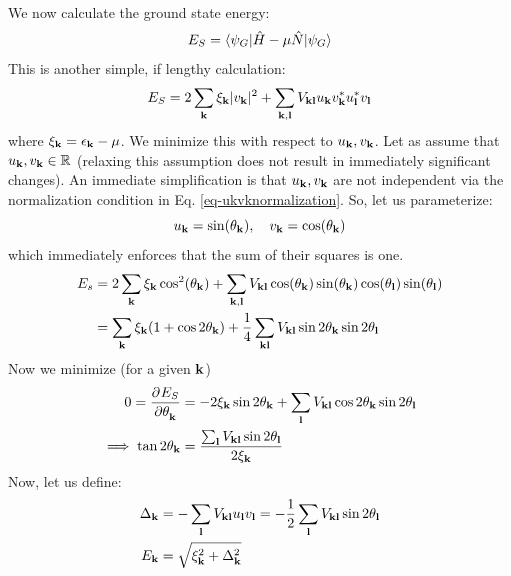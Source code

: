 We now calculate the ground state energy:
\begin{equation}
    E_S = \langle \psi_G \rvert\hat{H}- \mu\hat{N}\lvert \psi_G \rangle
\end{equation}
This is another simple, if lengthy calculation:
\begin{equation}
      E_S = 2\sum_{\mathbf{k}}\xi_{\mathbf{k}}\lvert v_{\mathbf{k}} \rvert^2 + \sum_{\mathbf{k}, \mathbf{l}}V_{\mathbf{k}\mathbf{l}}u_{\mathbf{k}}v_{\mathbf{k}}^* u_{\mathbf{l}}^* v_{\mathbf{l}}
\end{equation}
where $\xi_{\mathbf{k}} = \epsilon_{\mathbf{k}} - \mu$. We minimize this with respect to $u_{\mathbf{k}}, v_{\mathbf{k}}$. Let as assume that $u_{\mathbf{k}}, v_{\mathbf{k}} \in \mathbb{R}$ (relaxing this assumption does not result in immediately significant changes). An immediate simplification is that $u_{\mathbf{k}}, v_{\mathbf{k}}$ are not independent via the normalization condition in Eq. \eqref{eq-ukvknormalization}. So, let us parameterize:
\begin{equation}
    u_{\mathbf{k}} = \sin(\theta_{\mathbf{k}}), \quad v_{\mathbf{k}} = \cos(\theta_{\mathbf{k}})
\end{equation}
which immediately enforces that the sum of their squares is one.
\begin{equation}
    \begin{split}
        E_s &= 2\sum_{\mathbf{k}}\xi_{\mathbf{k}}\cos^2(\theta_{\mathbf{k}}) + \sum_{\mathbf{k}, \mathbf{l}}V_{\mathbf{k}\mathbf{l}} \cos(\theta_{\mathbf{k}})\sin(\theta_{\mathbf{k}})\cos(\theta_{\mathbf{l}})\sin(\theta_{\mathbf{l}}) \\ &= \sum_{\mathbf{k}}\xi_{\mathbf{k}}(1 + \cos2\theta_{\mathbf{k}}) + \frac{1}{4}\sum_{\mathbf{k}\mathbf{l}}V_{\mathbf{k}\mathbf{l}}\sin 2\theta_{\mathbf{k}}\sin 2\theta_{\mathbf{l}}
    \end{split}
\end{equation}
Now we minimize (for a given $\mathbf{k}$)
\begin{equation}
    \begin{split}
        0 = \dpd{E_S}{\theta_{\v{k}}} &= -2\xi_{\v{k}}\sin 2\theta_{\v{k}} + \sum_{\v{l}}V_{\v{k}\v{l}}\cos2\theta_{\v{k}}\sin2\theta_{\v{l}}
        \\ \implies \tan 2\theta_{\v{k}} &= \frac{\sum_{\v{l}}V_{\v{k}\v{l}}\sin2\theta_{\v{l}}}{2\xi_{\v{k}}}
    \end{split}
\end{equation}
Now, let us define:
\begin{equation}
    \begin{split}
        \Delta_{\mathbf{k}} &= -\sum_{\mathbf{l}}V_{\mathbf{k}\mathbf{l}}u_{\mathbf{l}}v_{\mathbf{l}} = -\frac{1}{2}\sum_{\mathbf{l}}V_{\mathbf{k}\mathbf{l}}\sin2\theta_{\mathbf{l}}
        \\ E_{\mathbf{k}} &= \sqrt{\xi_{\mathbf{k}}^2 + \Delta_{\mathbf{k}}^2}
    \end{split}
\end{equation}

